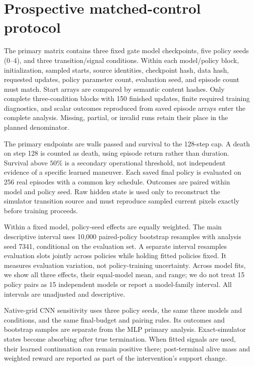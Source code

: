 
\section{Prospective matched-control protocol}
\label{app:matched}
The primary matrix contains three fixed gate model checkpoints, five policy seeds (0--4), and
three transition/signal conditions. Within each model/policy block, initialization, sampled starts,
source identities, checkpoint hash, data hash, requested updates, policy parameter count, evaluation
seed, and episode count must match. Start arrays are compared by semantic content hashes. Only
complete three-condition blocks with 150 finished updates, finite required training diagnostics,
and scalar outcomes reproduced from saved episode arrays enter the complete analysis. Missing,
partial, or invalid runs retain their place in the planned denominator.

The primary endpoints are walls passed and survival to the 128-step cap. A death on step 128 is
counted as death, using episode return rather than duration. Survival above $50\%$ is a secondary
operational threshold, not independent evidence of a specific learned maneuver. Each saved
final policy is evaluated on 256 real episodes with a common key schedule. Outcomes are paired
within model and policy seed. Raw hidden state is used only to reconstruct the simulator transition
source and must reproduce sampled current pixels exactly before training proceeds.

Within a fixed model, policy-seed effects are equally weighted. The main descriptive interval uses
10,000 paired-policy bootstrap resamples with analysis seed 7341, conditional on the evaluation set.
A separate interval resamples evaluation slots jointly across policies while holding fitted policies
fixed. It measures evaluation variation, not policy-training uncertainty. Across model fits, we
show all three effects, their equal-model mean, and range; we do not treat 15 policy pairs as 15
independent models or report a model-family interval. All intervals are unadjusted and descriptive.

Native-grid CNN sensitivity uses three policy seeds, the same three models and conditions, and the
same final-budget and pairing rules. Its outcomes and bootstrap samples are separate from the MLP
primary analysis. Exact-simulator states become absorbing after true termination. When fitted
signals are used, their learned continuation can remain positive there; post-terminal alive mass
and weighted reward are reported as part of the intervention's support change.

